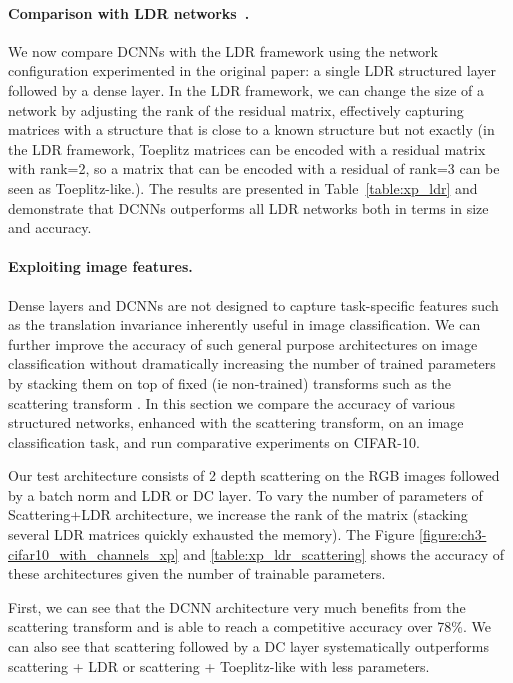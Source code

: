 \paragraph{Comparison with LDR networks~\cite{Thomas_NIPS2018_8119}.}
We now compare DCNNs with the LDR framework using the network configuration experimented in the original paper: a single LDR structured layer followed by a dense layer.
In the LDR framework, we can change the size of a network by adjusting the rank of the residual matrix, effectively capturing matrices with a structure that is close to a known structure but not exactly (in the LDR framework, Toeplitz matrices can be encoded with a residual matrix with rank=2, so a matrix that can be encoded with a residual of rank=3 can be seen as Toeplitz-like.).
The results are presented in Table~\ref{table:xp_ldr} and demonstrate that DCNNs outperforms all LDR networks both in terms in size and accuracy.

\paragraph{Exploiting image features.}
Dense layers and DCNNs are not designed to capture task-specific features such as the translation invariance inherently useful in image classification.
We can further improve the accuracy of such general purpose architectures on image classification without dramatically increasing the number of trained parameters by stacking them on top of fixed (ie non-trained) transforms such as the scattering transform \cite{mallat2010recursive}.
In this section we compare the accuracy of various structured networks, enhanced with the scattering transform, on an image classification task, and run comparative experiments on CIFAR-10. 

Our test architecture consists of 2 depth scattering on the RGB images followed by a batch norm and LDR or DC layer.
To vary the number of parameters of Scattering+LDR architecture, we increase the rank of the matrix (stacking several LDR matrices quickly exhausted the memory).
The Figure \ref{figure:ch3-cifar10_with_channels_xp} and \ref{table:xp_ldr_scattering} shows the accuracy of these architectures given the number of trainable parameters.

First, we can see that the DCNN architecture very much benefits from the scattering transform and is able to reach a competitive accuracy over 78\%.
We can also see that scattering followed by a DC layer systematically outperforms scattering + LDR or scattering + Toeplitz-like with less parameters. 



